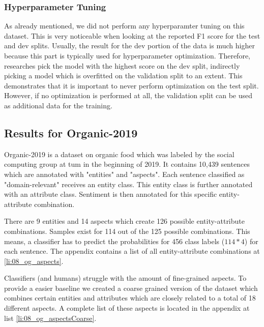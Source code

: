 \subsubsection*{Hyperparameter Tuning}
\label{sec:06_hpTuningAmazon}
As already mentioned, we did not perform any hyperparamter tuning on this dataset. This is very noticeable when looking at the reported F1 score for the test and dev splits. Usually, the result for the dev portion of the data is much higher because this part is typically used for hyperparameter optimization. Therefore, researches pick the model with the highest score on the dev split, indirectly picking a model which is overfitted on the validation split to an extent. This demonstrates that it is important to never perform optimization on the test split. However, if no optimization is performed at all, the validation split can be used as additional data for the training.  



\subsection{Results for Organic-2019}
\label{sec:06_ResultsOrganic}

Organic-2019 is a dataset on organic food which was labeled by the social computing group at \gls{tum} in the beginning of 2019. It contains 10,439 sentences which are annotated with "entities" and "aspects". Each sentence classified as "domain-relevant" receives an entity class. This entity class is further annotated with an attribute class. Sentiment is then annotated for this specific entity-attribute combination.
\medskip

There are 9 entities and 14 aspects which create 126 possible entity-attribute combinations. Samples exist for 114 out of the 125 possible combinations. This means, a classifier has to predict the probabilities for 456 class labels {($114*4$)} for each sentence. The appendix contains a list of all entity-attribute combinations at \ref{li:08_og_aspects}.
\medskip

Classifiers {(and humans)} struggle with the amount of fine-grained aspects. To provide a easier baseline we created a coarse grained version of the dataset which combines certain entities and attributes which are closely related to a total of 18 different aspects. A complete list of these aspects is located in the appendix at list \ref{li:08_og_aspectsCoarse}.
\medskip

